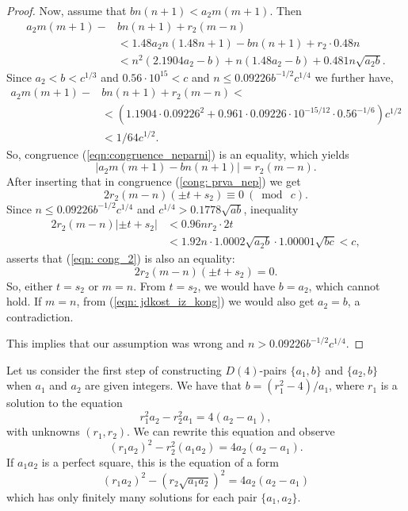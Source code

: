 \documentclass[12pt]{amsart}%
\theoremstyle{definition}
\theoremstyle{remark}
\theoremstyle{plain}
\begin{document}
\begin{proof}
Now, assume that $bn(n +1)< a_2m(m+1)$. Then
\begin{align*}
    a_2m(m+1)-&bn(n+1)+r_2(m-n)\\
    &<1.48a_2n(1.48n+1)-bn(n+1)+r_2\cdot 0.48 n\\
    &<n^2(2.1904a_2-b)+n(1.48a_2-b)+0.481n\sqrt{a_2 b}.
\end{align*}
Since $a_2<b<c^{1/3}$ and $0.56\cdot10^{15}<c$ and $n\leq 0.09226b^{-1/2}c^{1/4}$ we further have,
\begin{align*}
    a_2m(m+1)-&bn(n+1)+r_2(m-n)<\\
    &<(1.1904\cdot 0.09226^2+0.961\cdot 0.09226\cdot 10^{-15/12}\cdot 0.56^{-1/6})c^{1/2}\\
    &<1/64c^{1/2}.
\end{align*}
So, congruence (\ref{eqn:congruence_neparni}) is an equality, which yields
\begin{equation}\label{eqn: jdkost_iz_kong}
    |a_2m(m+1)-bn(n+1)|=r_2(m-n).
\end{equation}
After inserting that in congruence (\ref{cong: prva_nep}) we get
\begin{equation}\label{eqn: cong_2}
2r_2(m-n)(\pm t+s_2)\equiv 0\ (\bmod \ c).
\end{equation}
Since $n\leq 0.09226b^{-1/2}c^{1/4}$ and $c^{1/4}>0.1778\sqrt{ab}$, inequality
\begin{align*}
    2r_2(m-n)|\pm t+s_2|&<0.96nr_2\cdot 2t\\
    &<1.92n\cdot 1.0002\sqrt{a_2 b}\cdot 1.00001\sqrt{bc}<c,
\end{align*}
asserts that (\ref{eqn: cong_2}) is also an equality:
$$2r_2(m-n)(\pm t+s_2)= 0.$$
So, either $t=s_2$ or $m=n$. From $t=s_2$, we would have $b=a_2$, which cannot hold. If $m=n$, from (\ref{eqn: jdkost_iz_kong}) we would also get $a_2=b$, a contradiction. 

This implies that our assumption was wrong and $n>0.09226b^{-1/2}c^{1/4}$. 
\end{proof}

Let us consider the first step of constructing $D(4)$-pairs $\{a_1,b\}$ and $\{a_2,b\}$ when $a_1$ and $a_2$ are given integers. We have that $b=(r_1^2-4)/a_1$, where $r_1$ is a solution to the equation 
$$r_1^2a_2-r_2^2a_1=4(a_2-a_1),$$
with unknowns $(r_1,r_2)$. We can rewrite this equation and observe
\begin{equation}\label{eq:pellova_konacno}
(r_1a_2)^2-r_2^2(a_1a_2)=4a_2(a_2-a_1).
\end{equation}
If $a_1a_2$ is a perfect square, this is the equation of a form
\begin{equation}\label{eq:razlika_kv}(r_1a_2)^2-(r_2\sqrt{a_1a_2})^2=4a_2(a_2-a_1)\end{equation}
which has only finitely many solutions for each pair $\{a_1,a_2\}$. 
\end{document}
